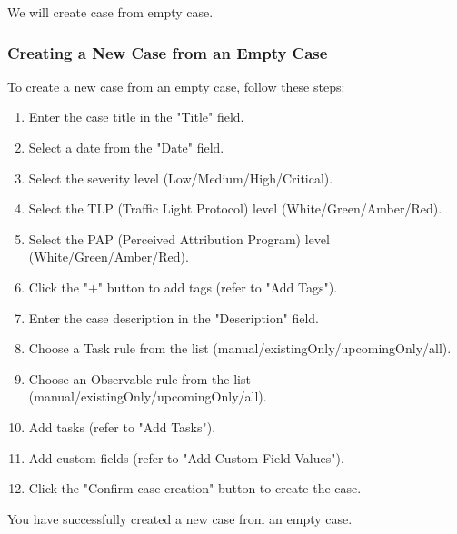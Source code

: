 \documentclass{article}
\begin{document}
We will create case from empty case.\\

\subsubsection*{Creating a New Case from an Empty Case}

To create a new case from an empty case, follow these steps:

\begin{enumerate}
  \item Enter the case title in the "Title" field.
  \item Select a date from the "Date" field.
  \item Select the severity level (Low/Medium/High/Critical).
  \item Select the TLP (Traffic Light Protocol) level (White/Green/Amber/Red).
  \item Select the PAP (Perceived Attribution Program) level (White/Green/Amber/Red).
  \item Click the "+" button to add tags (refer to "Add Tags").
  \item Enter the case description in the "Description" field.
  \item Choose a Task rule from the list (manual/existingOnly/upcomingOnly/all).
  \item Choose an Observable rule from the list (manual/existingOnly/upcomingOnly/all).
  \item Add tasks (refer to "Add Tasks").
  \item Add custom fields (refer to "Add Custom Field Values").
  \item Click the "Confirm case creation" button to create the case.
\end{enumerate}

You have successfully created a new case from an empty case.
\end{document}
